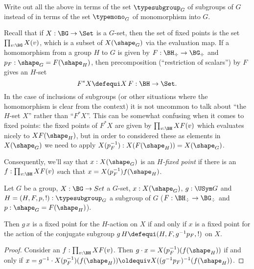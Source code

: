 \begin{xca}
  Write out all the above in terms of the set $\typesubgroup_G$ of subgroups of $G$ instead of in terms of the set $\typemono_G$ of monomorphism into $G$.
\end{xca}


Recall that if $X:\BG\to\Set$ is a $G$-set, then the set of fixed points is the set $\prod_{v:\BG}X(v)$, which is a subset of $X(\shape_G)$ via the evaluation map.  If a homomorphism from a group $H$ to $G$ is given by $F:\BH_\div\to \BG_\div$ and $p_F:\shape_G=F(\shape_H)$, then precomposition (``restriction of scalars'') by $F$ gives an $H$-set
$$F^*X\defequi X\,F:\BH\to\Set.$$
In the case of inclusions of subgroups (or other situations where the homomorphism is clear from the context) it is not uncommon to talk about ``the $H$-set $X$'' rather than ``$F^*X$''.
This can be somewhat confusing when it comes to fixed points: the fixed points of $F^*X$ are given by $\prod_{v:\BH}XF(v)$ which evaluates nicely to $XF(\shape_H)$, but in order to considered  these as elements in $X(\shape_G)$ we need to apply $X(p_F^{-1}):X(F(\shape_H))=X(\shape_G)$.

Consequently, we'll say that $x:X(\shape_G)$ is an \emph{$H$-fixed point} if there is an $f:\prod_{v:\BH}XF(v)$ such that $x=X(p_F^{-1})f(\shape_H)$.



\begin{lemma}
  \label{lem:thereisaconjugate}
  Let $G$ be a group, $X:\BG\to Set$ a $G$-set, $x:X(\shape_G)$, $g:\USym G$ and $H=(H,F,p,!):\typesubgroup_G$ a subgroup of $G$ ($F:\BH_\div\to \BG_\div$ and $p:\shape_G=F(\shape_H)$).

Then $g\,x$ is a fixed point for the $H$-action on $X$ if and only if $x$ is a fixed point for the action  of the conjugate subgroup $g\,H\defequi(H,F,g^{-1}p_F,!)$ on $X$.
\end{lemma}
\begin{proof}
  Consider an $f:\prod_{v:\BH}XF(v)$.  Then $g\cdot x=X(p_F^{-1})(f(\shape_H))$ if and only if $x=g^{-1}\cdot X(p_F^{-1})(f(\shape_H))\oldequiv X((g^{-1}p_F)^{-1}(f(\shape_H))$.
\end{proof}




